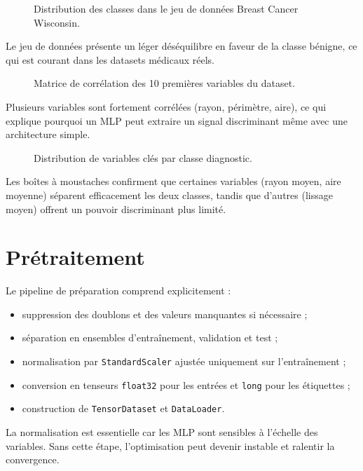 \begin{figure}[H]
    \centering
    \caption{Distribution des classes dans le jeu de données Breast Cancer Wisconsin.}
\end{figure}
Le jeu de données présente un léger déséquilibre en faveur de la classe bénigne, ce qui est courant dans les datasets médicaux réels.

\begin{figure}[H]
    \centering
    \caption{Matrice de corrélation des 10 premières variables du dataset.}
\end{figure}
Plusieurs variables sont fortement corrélées (rayon, périmètre, aire), ce qui explique pourquoi un MLP peut extraire un signal discriminant même avec une architecture simple.

\begin{figure}[H]
    \centering
    \caption{Distribution de variables clés par classe diagnostic.}
\end{figure}
Les boîtes à moustaches confirment que certaines variables (rayon moyen, aire moyenne) séparent efficacement les deux classes, tandis que d'autres (lissage moyen) offrent un pouvoir discriminant plus limité.

\section{Prétraitement}
Le pipeline de préparation comprend explicitement :
\begin{itemize}[leftmargin=1.2cm]
    \item suppression des doublons et des valeurs manquantes si nécessaire ;
    \item séparation en ensembles d’entraînement, validation et test ;
    \item normalisation par \texttt{StandardScaler} ajustée uniquement sur l’entraînement ;
    \item conversion en tenseurs \texttt{float32} pour les entrées et \texttt{long} pour les étiquettes ;
    \item construction de \texttt{TensorDataset} et \texttt{DataLoader}.
\end{itemize}
La normalisation est essentielle car les MLP sont sensibles à l’échelle des variables. Sans cette étape, l’optimisation peut devenir instable et ralentir la convergence.

